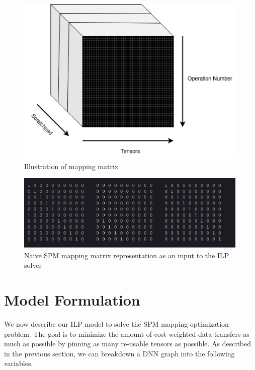 \begin{figure}[thb!]
\centering
\includegraphics[scale=0.7]{Figures/mapping_matrix_cube.png}
\decoRule
\caption[Cube]{Illustration of mapping matrix}
\label{fig:mappingCube}
\end{figure}


\begin{figure}[thb!]
\centering
\includegraphics[scale=0.5]{Figures/naive_matrix_mapping.png}
\decoRule
\caption[naive2d]{Naive SPM mapping matrix representation as an input to the ILP solver}
\label{fig:naiveSPM2D}
\end{figure}

\section{Model Formulation}

We now describe our ILP model to solve the SPM mapping optimization problem. The goal is to minimize
the amount of cost weighted data transfers as much as possible by pinning as many re-usable tensors
as possible. As described in the previous section, we can breakdown a DNN graph into the following variables.

